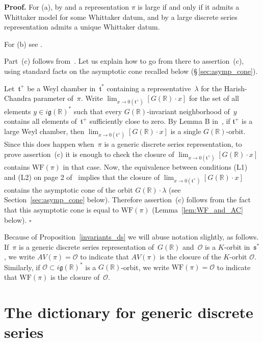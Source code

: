 \documentclass[10pt,leqno]{article}
\numberwithin{equation}{section}
\newcommand{\qed}{\hfill $\square$ \medskip}
\newenvironment{proof}[1][Proof]{\noindent\textbf{#1.} }{\qed}
\renewcommand{\O}{\mathcal O}
\newcommand{\R}{\mathbb R}
\newcommand{\g}{\mathfrak g}
\newcommand{\s}{\mathfrak s}
\newcommand{\WF}{\mathrm{WF}}
\begin{document}
\begin{proof} For (a), by \cite{vogan-gelfand-kirillov} and \cite{kostant_whittaker}
a representation $\pi$ is large if and only if it admits a Whittaker model for some Whittaker datum,
and by \cite[Lemma 14.14]{abv} a  large discrete series representation admits a unique Whittaker datum.

For (b) see \cite[Proposition A.9]{AV1}.

Part~(c) follows from~\cite[Lemma B]{rossmann_limit_orbits}. Let us explain how to go from there to  assertion~(c), using standard facts on the asymptotic cone recalled below (\S\,{}\ref{sec:asymp_cone}).

Let~$\mathfrak{t}^+$ be a Weyl chamber in~$\mathfrak{t}^\ast$ containing a representative~$\lambda$ for the Harish-Chandra parameter of~$\pi$. Write $\lim_{x \to 0(\mathfrak{t}^+)}\left[ G(\R)\cdot x\right]$ for the set of all elements $y \in i\g(\R)^\ast$ such that every $G(\R)$-invariant neighborhood of~$y$ contains all elements of~$\mathfrak{t}^+$ sufficiently close to zero. By Lemma B in~\cite{rossmann_limit_orbits}, if $\mathfrak{t}^+$ is a large Weyl chamber, then $\lim_{x \to 0(\mathfrak{t}^+)} \left[G(\R)\cdot x\right]$ is a single $G(\R)$-orbit.  Since this does happen when~$\pi$ is a generic discrete series representation, to prove assertion~(c)  it is enough to check the closure of $\lim_{x \to 0(\mathfrak{t}^+)} \left[G(\R)\cdot x\right]$ contains $\WF(\pi)$ in that case. Now, the equivalence between conditions  (L1) and (L2) on page 2 of~\cite{rossmann_limit_orbits} implies that the closure of $\lim_{x \to 0(\mathfrak{t}^+)} \left[G(\R)\cdot x\right]$ contains the asymptotic cone of the orbit $G(\R)\cdot \lambda$  (see  Section~\ref{sec:asymp_cone} below). Therefore assertion~(c) follows from the fact that this asymptotic cone is equal to  $\WF(\pi)$  (Lemma~\ref{lem:WF_and_AC} below).
\end{proof}

Because of Proposition~\ref{invariants_ds} we will abuse notation slightly, as follows. If~$\pi$ is a generic discrete series representation of~$G(\R)$ and~$\O$ is a $K$-orbit in~$\s^\ast$, we write $AV(\pi)=\O$ to indicate that $AV(\pi)$ is the closure of the $K$-orbit $\O$. 
Similarly, if $\O\subset i\g(\R)^*$ is a $G(\R)$-orbit, we write $\WF(\pi)=\O$ to indicate that $\WF(\pi)$ is the closure of~$\O$. 



\section{The dictionary for generic discrete series}
\end{document}
